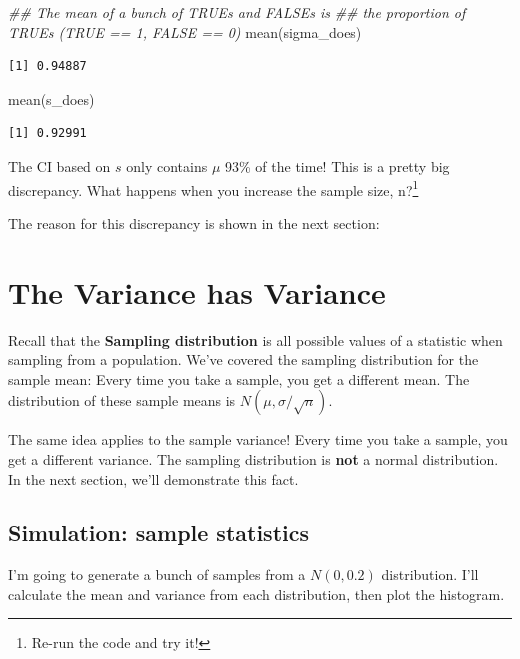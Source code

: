 \documentclass[
  letterpaper,
  DIV=11,
  numbers=noendperiod,
  oneside]{scrreprt}
\newenvironment{Shaded}{\begin{snugshade}}{\end{snugshade}}
\newcommand{\DocumentationTok}[1]{\textcolor[rgb]{0.37,0.37,0.37}{\textit{#1}}}
\newcommand{\FunctionTok}[1]{\textcolor[rgb]{0.28,0.35,0.67}{#1}}
\newcommand{\NormalTok}[1]{\textcolor[rgb]{0.00,0.23,0.31}{#1}}
\begin{document}
\begin{Shaded}
\begin{Highlighting}[]
\DocumentationTok{\#\# The mean of a bunch of TRUEs and FALSEs is}
\DocumentationTok{\#\# the proportion of TRUEs (TRUE == 1, FALSE == 0)}
\FunctionTok{mean}\NormalTok{(sigma\_does)}
\end{Highlighting}
\end{Shaded}

\begin{verbatim}
[1] 0.94887
\end{verbatim}

\begin{Shaded}
\begin{Highlighting}[]
\FunctionTok{mean}\NormalTok{(s\_does)}
\end{Highlighting}
\end{Shaded}

\begin{verbatim}
[1] 0.92991
\end{verbatim}

The CI based on \(s\) only contains \(\mu\) 93\% of the time! This is a
pretty big discrepancy. What happens when you increase the sample size,
n?\footnote{Re-run the code and try it!}

The reason for this discrepancy is shown in the next section:

\hypertarget{the-variance-has-variance}{%
\section{The Variance has Variance}\label{the-variance-has-variance}}

Recall that the \textbf{Sampling distribution} is all possible values of
a statistic when sampling from a population. We've covered the sampling
distribution for the sample mean: Every time you take a sample, you get
a different mean. The distribution of these sample means is
\(N(\mu,\sigma/\sqrt{n})\).

The same idea applies to the sample variance! Every time you take a
sample, you get a different variance. The sampling distribution is
\textbf{not} a normal distribution. In the next section, we'll
demonstrate this fact.

\hypertarget{simulation-sample-statistics}{%
\subsection{Simulation: sample
statistics}\label{simulation-sample-statistics}}

I'm going to generate a bunch of samples from a \(N(0, 0.2)\)
distribution. I'll calculate the mean and variance from each
distribution, then plot the histogram.
\end{document}
